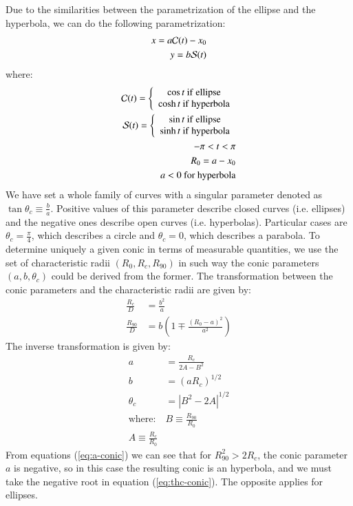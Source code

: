 Due to the similarities between the parametrization of the ellipse and the hyperbola, we can do the following parametrization:
\begin{align}
x = a\mathcal{C}(t)-x_0 \label{eq:par-x}\\ 
y = b\mathcal{S}(t) \label{eq:par-y}
\end{align}
where:
\begin{align}
\mathcal{C}(t) = \left\lbrace \begin{array}{c}
\cos t ~\mathrm{if~ellipse} \\
\cosh t ~\mathrm{if~hyperbola}
\end{array}\right.\\
\mathcal{S}(t) = \left\lbrace \begin{array}{c}
\sin t ~\mathrm{if~ellipse} \\
\sinh t ~\mathrm{if~hyperbola}
\end{array}\right. \\
-\pi < t < \pi \\
R_0 = a - x_0 \\
a<0 ~ \mathrm{for~hyperbola}
\end{align}
We have set a whole family of curves with a singular parameter denoted as $\tan\theta_c \equiv \frac{b}{a}$. Positive values of this parameter describe closed curves
(i.e. ellipses) and the negative ones describe open curves (i.e. hyperbolas). Particular cases are $\theta_c =\frac{\pi}{4}$, which describes a circle and $\theta_c=0$, which describes
a parabola.
To determine uniquely a given conic in terms of measurable quantities, we use the set of characteristic radii $(R_0,R_c,R_{90})$ in such way the conic parameters $(a,b,\theta_c)$
could be derived from the former. The transformation between the conic parameters and the characteristic radii are given by:
\begin{align}
\frac{R_c}{D} &= \frac{b^2}{a} \label{eq:Rc-conic}\\ 
\frac{R_{90}}{D} &= b\left(1 \mp \frac{(R_0-a)^2}{a^2}\right)
\end{align}
The inverse transformation is given by:
\begin{align}
a &= \frac{R_c}{2A-B^2} \label{eq:a-conic}\\
b &= \left(aR_c\right)^{1/2}\\
\theta_c &= \left|B^2 - 2A\right|^{1/2} \label{eq:thc-conic} \\
\mathrm{where:}& B\equiv \frac{R_{90}}{R_0} \\
A \equiv \frac{R_c}{R_0}
\end{align}
From equations (\ref{eq:a-conic}) we can see that for $R^2_{90} > 2 R_c$, the conic parameter $a$ is negative, so in this case the resulting conic is an hyperbola, and we must take the negative root
in equation (\ref{eq:thc-conic}). The opposite applies for ellipses.
